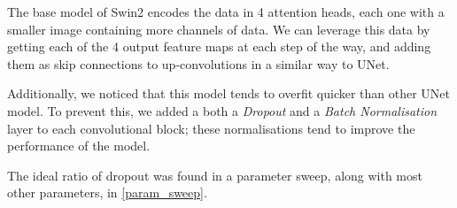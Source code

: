 The base model of Swin2 encodes the data in 4 attention heads, each one with a smaller image containing more channels of data.
We can leverage this data by getting each of the 4 output feature maps at each step of the way, and adding them as skip connections to up-convolutions in a similar way to UNet.

Additionally, we noticed that this model tends to overfit quicker than other UNet model.
To prevent this, we added a both a \emph{Dropout} and a \emph{Batch Normalisation} layer to each convolutional block; these normalisations tend to improve the performance of the model.

The ideal ratio of dropout was found in a parameter sweep, along with most other parameters, in \cref{param_sweep}.

